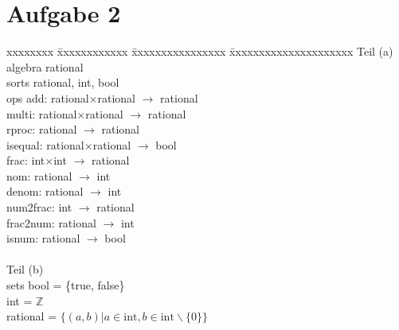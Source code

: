 \documentclass[12pt, twoside]{article}
\begin{document}
\section{Aufgabe 2}
\begin{tabbing}
xxxxxxxx \= xxxxxxxxxxxx \= xxxxxxxxxxxxxxxx \=   xxxxxxxxxxxxxxxxxxxxx  \kill
Teil (a) \\
algebra \> rational          \\
sorts       \> rational, int, bool                                                  \\
ops         \> add:                 \> rational$\times$rational   \> $\rightarrow$ rational     \\
            \> multi:               \> rational$\times$rational   \> $\rightarrow$ rational     \\
            \> rproc:               \> rational                   \> $\rightarrow$ rational     \\
            \> isequal:             \> rational$\times$rational   \> $\rightarrow$ bool         \\
            \> frac:                \> int$\times$int             \> $\rightarrow$ rational     \\
            \> nom:                 \> rational                   \> $\rightarrow$ int          \\
            \> denom:               \> rational                   \> $\rightarrow$ int          \\
            \> num2frac:            \> int                        \> $\rightarrow$ rational     \\
            \> frac2num:            \> rational                   \> $\rightarrow$ int          \\
            \> isnum:               \> rational                   \> $\rightarrow$ bool         \\
            \\
Teil (b) \\
sets        \> bool = \{true, false\} \\
            \> int = $\mathbb{Z}$ \\
            \> rational = $\{(a,b)|a \in \text{int}, b \in \text{int} \backslash \{0\}\}$       \\
     

\end{tabbing}
\end{document}
